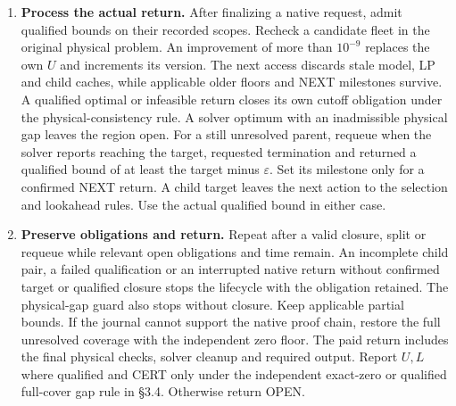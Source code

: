 \documentclass[
  american,
  11pt,
]{article}
\providecommand{\tightlist}{%
  \setlength{\itemsep}{0pt}\setlength{\parskip}{0pt}}
\begin{document}
\begin{enumerate}
  \begin{itemize}
  \tightlist
  \item
    At depth 8 or the minimum width \(10^{-4}\) (with geometric
    tolerance), solve the full parent MIP without a bound target.
  \item
    Otherwise obtain both complete qualified midpoint child LPs on the
    current cutoff. If either is infeasible, install both covering
    children together and mark the infeasible subset or subsets empty.
    If both return finite optimal bounds, put
    \(t=\min\{\ell_0,\ell_1\}\). For \(t\le b_I+\varepsilon\), solve the
    full parent MIP. For \(t>b_I+\varepsilon\), split atomically if AM
    passes. Otherwise solve the parent MIP with stopping target \(t\).
    The parent covers the entire interval until both children are
    installed. Each installed child inherits applicable parent evidence
    and its own qualified evidence.
  \end{itemize}
\item
  \textbf{Process the actual return.} After finalizing a native request,
  admit qualified bounds on their recorded scopes. Recheck a candidate
  fleet in the original physical problem. An improvement of more than
  \(10^{-9}\) replaces the own \(U\) and increments its version. The
  next access discards stale model, LP and child caches, while
  applicable older floors and NEXT milestones survive. A qualified
  optimal or infeasible return closes its own cutoff obligation under
  the physical-consistency rule. A solver optimum with an inadmissible
  physical gap leaves the region open. For a still unresolved parent,
  requeue when the solver reports reaching the target, requested
  termination and returned a qualified bound of at least the target
  minus \(\varepsilon\). Set its milestone only for a confirmed NEXT
  return. A child target leaves the next action to the selection and
  lookahead rules. Use the actual qualified bound in either case.
\item
  \textbf{Preserve obligations and return.} Repeat after a valid
  closure, split or requeue while relevant open obligations and time
  remain. An incomplete child pair, a failed qualification or an
  interrupted native return without confirmed target or qualified
  closure stops the lifecycle with the obligation retained. The
  physical-gap guard also stops without closure. Keep applicable partial
  bounds. If the journal cannot support the native proof chain, restore
  the full unresolved coverage with the independent zero floor. The paid
  return includes the final physical checks, solver cleanup and required
  output. Report \(U,L\) where qualified and CERT only under the
  independent exact-zero or qualified full-cover gap rule in §3.4.
  Otherwise return OPEN.
\end{enumerate}
\end{document}
